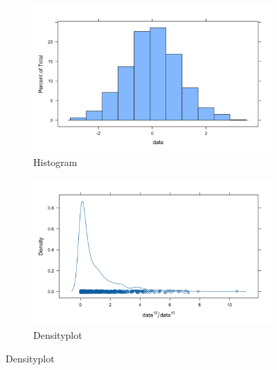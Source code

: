 \documentclass[10pt, a4paper, titlepage]{article}
\begin{document}
\begin{figure}[H]
    \centering
    \begin{subfigure}{0.4\textwidth}
        \includegraphics[width=\textwidth]{(a) Histogram.png}
        \caption{Histogram}
        \label{fig:histogram}
    \end{subfigure}
    \hfill
    \begin{subfigure}{0.4\textwidth}
        \includegraphics[width=\textwidth]{(b)DensityPlot.png}
        \caption{Densityplot}
        \label{fig:densityplot}
    \end{subfigure}
    

\end{figure}
\end{document}
